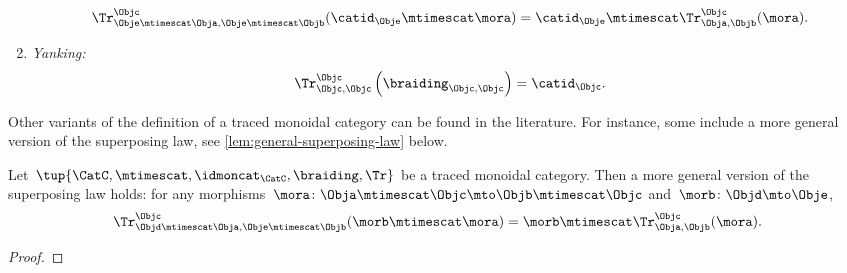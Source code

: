 \begin{ctdefinition}
\begin{enumerate}
              \begin{equation}
                  \label{eq:superposing}
                  \Tr_{\Obje\mtimescat \Obja,\Obje\mtimescat \Objb}^{\Objc}(\catid_\Obje\mtimescat \mora)=\catid_\Obje\mtimescat \Tr_{\Obja,\Objb}^\Objc(\mora).
              \end{equation}
        \item \emph{Yanking:}
              \begin{equation}
                  \label{eq:yanking}
                  \Tr_{\Objc,\Objc}^\Objc\left(\braiding_{\Objc,\Objc}\right)=\catid_\Objc.
              \end{equation}
    \end{enumerate}
\end{ctdefinition}

\begin{remark}
    Other variants of the definition of a traced monoidal category can be found in the literature.
    For instance, some include a more general version of the superposing law, see \cref{lem:general-superposing-law} below.
\end{remark}

\begin{lemma}
    \label{lem:general-superposing-law}
    Let~$\tup{\CatC,\mtimescat,\idmoncat_{\CatC}, \braiding, \Tr}$ be a traced monoidal category.
    Then a more general version of the superposing law holds: for any morphisms~$\mora\colon \Obja\mtimescat \Objc \mto \Objb \mtimescat \Objc$ and~$\morb \colon \Objd \mto \Obje$,
    \begin{equation}
        \label{eq:superposing_2}
        \Tr_{\Objd\mtimescat \Obja,\Obje\mtimescat \Objb}^{\Objc}(\morb \mtimescat \mora)=\morb \mtimescat \Tr_{\Obja,\Objb}^\Objc(\mora).
    \end{equation}
\end{lemma}

\begin{proof}
    \missingproof
\end{proof}

